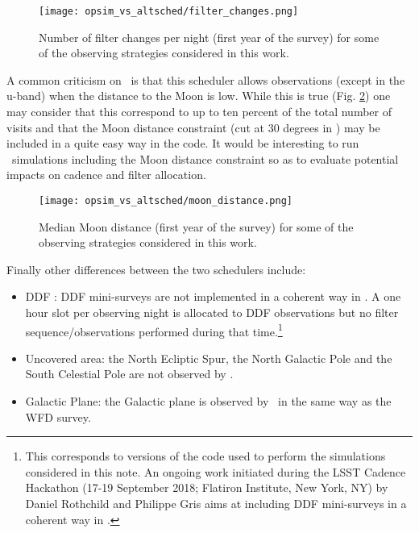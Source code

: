 \begin{figure}[!htbp]
  \begin{center}
    \texttt{[image: opsim\_vs\_altsched/filter\_changes.png]}
    \caption{Number of filter changes per night (first year of the survey) for some of the observing strategies considered in this work.}\label{fig:filter_changes}
    \end{center}
\end{figure}

A common criticism on \altsched~is that this scheduler allows observations (except in the u-band) when the distance to the Moon is low. While this is true (Fig. \ref{fig:moondist}) one may consider that this correspond to up to ten percent of the total number of visits and that the Moon distance constraint (cut at 30 degrees in \opsim) may be included in a quite easy way in the code. It would be interesting to run \altsched~simulations including the Moon distance constraint so as to evaluate potential impacts on cadence and filter allocation.

\begin{figure}[!htbp]
  \begin{center}
    \texttt{[image: opsim\_vs\_altsched/moon\_distance.png]}
    \caption{Median Moon distance (first year of the survey) for some of the observing strategies considered in this work.}\label{fig:moondist}
    \end{center}
\end{figure}


Finally other differences between the two schedulers include:
\begin{itemize}
\item{DDF} : DDF mini-surveys are not implemented in a coherent way in \altsched. A one hour slot per observing night is allocated to DDF observations but no filter sequence/observations performed during that time.\footnote{This corresponds to versions of the code used to perform the simulations considered in this note. An ongoing work initiated during the LSST Cadence Hackathon (17-19 September 2018; Flatiron Institute, New York, NY) by Daniel Rothchild and Philippe Gris aims at including DDF mini-surveys in a coherent way in \altsched.}
\item{Uncovered area}:  the North Ecliptic Spur, the North Galactic Pole and the South Celestial Pole are not observed by \altsched.
\item{Galactic Plane}: the Galactic plane is observed by \altsched~in the same way as the WFD survey.

\end{itemize}

